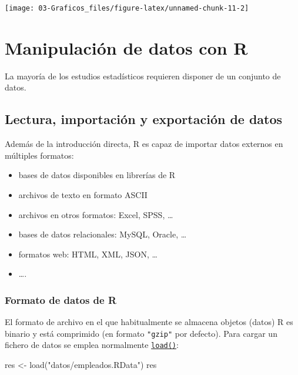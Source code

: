\documentclass[
]{book}
\newenvironment{Shaded}{\begin{snugshade}}{\end{snugshade}}
\newcommand{\FunctionTok}[1]{\textcolor[rgb]{0.00,0.00,0.00}{#1}}
\newcommand{\NormalTok}[1]{#1}
\newcommand{\OtherTok}[1]{\textcolor[rgb]{0.56,0.35,0.01}{#1}}
\newcommand{\StringTok}[1]{\textcolor[rgb]{0.31,0.60,0.02}{#1}}
\theoremstyle{break}
\begin{document}
\begin{center}\texttt{[image: 03-Graficos\_files/figure-latex/unnamed-chunk-11-2]} \end{center}

\hypertarget{manipulaciuxf3n-de-datos-con-r}{%
\chapter{Manipulación de datos con R}\label{manipulaciuxf3n-de-datos-con-r}}

La mayoría de los estudios estadísticos
requieren disponer de un conjunto de datos.

\hypertarget{lectura-importaciuxf3n-y-exportaciuxf3n-de-datos}{%
\section{Lectura, importación y exportación de datos}\label{lectura-importaciuxf3n-y-exportaciuxf3n-de-datos}}

Además de la introducción directa, R es capaz de
importar datos externos en múltiples formatos:

\begin{itemize}
\item
  bases de datos disponibles en librerías de R
\item
  archivos de texto en formato ASCII
\item
  archivos en otros formatos: Excel, SPSS, \ldots{}
\item
  bases de datos relacionales: MySQL, Oracle, \ldots{}
\item
  formatos web: HTML, XML, JSON, \ldots{}
\item
  \ldots.
\end{itemize}

\hypertarget{formato-de-datos-de-r}{%
\subsection{Formato de datos de R}\label{formato-de-datos-de-r}}

El formato de archivo en el que habitualmente se almacena objetos (datos)
R es binario y está comprimido (en formato \texttt{"gzip"} por defecto).
Para cargar un fichero de datos se emplea normalmente \href{https://www.rdocumentation.org/packages/base/versions/3.6.1/topics/load}{\texttt{load()}}:

\begin{Shaded}
\begin{Highlighting}[]
\NormalTok{res }\OtherTok{\textless{}{-}} \FunctionTok{load}\NormalTok{(}\StringTok{"datos/empleados.RData"}\NormalTok{)}
\NormalTok{res}
\end{Highlighting}
\end{Shaded}
\end{document}
